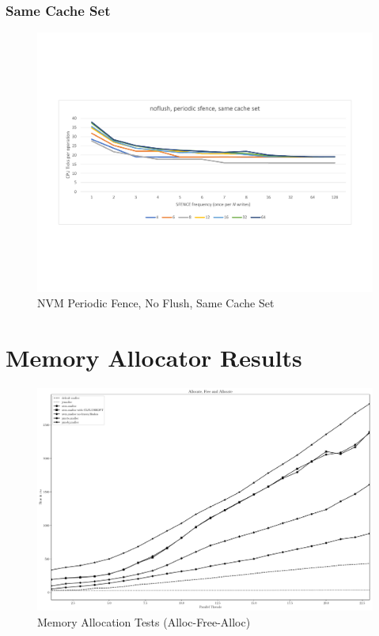 \subsubsection{Same Cache Set}

\begin{figure}
    \centering
    \caption{NVM Periodic Fence, No Flush, Same Cache Set}\label{micro:sfence:noflush:same}
    \includegraphics[scale=0.35]{micro/nvm-noflush-periodic-same.pdf}
\end{figure}

\section{Memory Allocator Results}\label{section:results:malloc}

\begin{figure}
    \centering
    \caption{Memory Allocation Tests (Alloc-Free-Alloc)}\label{plot:afa}
    \includegraphics[scale=0.35]{malloc/alloc_free_alloc.pdf}
\end{figure}


